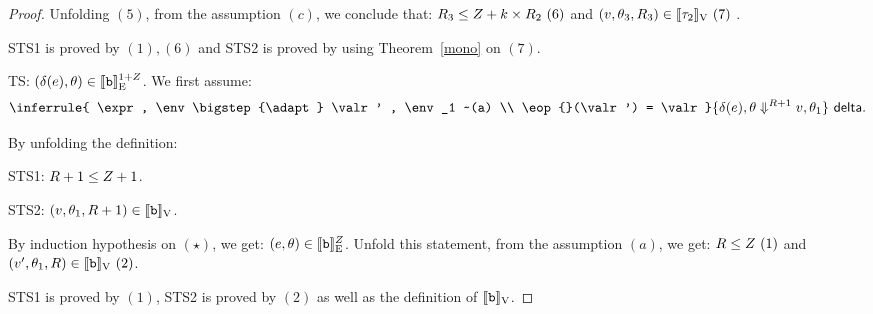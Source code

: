 \begin{proof}
Unfolding $(5)$, from the assumption $(c)$, we conclude that: $ R_3 \leq Z+k\times R_2~(6)$ and $(v, \theta_3, R_3) \in [\![ \tau_2 ]\!]_{\text{V}} ~(7) $ .

STS1 is proved by $(1), (6)$ and STS2 is proved by using Theorem~\ref{mono} on $(7)$. \\


 TS: $(\delta(e), \theta ) \in  [\![  \mathtt{b}  ]\!]_{\text{E}}^{  1+ Z}$.
 We first assume:
 \[ \inferrule{
    \expr , \env \bigstep{\adapt} \valr' , \env_1 ~(a) \\
    \eop{}(\valr') = \valr
  }{
    \eop(\expr), \env \bigstep{\adapt +1} \valr,  \env_1
  }~\textsf{delta}.
  \]

  By unfolding the definition:

  STS1: $R+1 \leq Z +1$.
  
STS2: $ (v, \theta_1, R+1) \in [\![ \mathtt{b} ]\!]_{\text{V}} $.

By induction hypothesis on $(\star)$, we get: $ (e, \theta) \in [\![ \mathtt{b} ]\!]_{\text{E}}^{ Z} $.
Unfold this statement, from the assumption $(a)$, we get: $ R \leq Z~(1) $ and $ (v', \theta_1, R)  \in [\![ \mathtt{b} ]\!]_{\text{V}}~(2)$.

STS1 is proved by $(1)$,  STS2 is proved by $(2)$ as well as the definition of $[\![ \mathtt{b} ]\!]_{\text{V}}$.





 \end{proof} 
